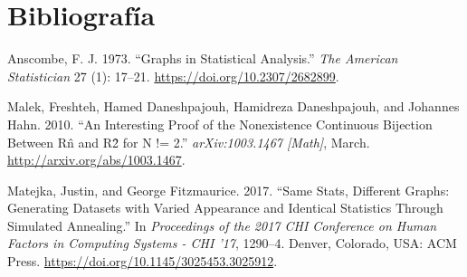 \documentclass[runningheads,español]{llncs}
\begin{document}
\hypertarget{bibliografia}{%
\section*{Bibliografía}\label{bibliografia}}

\hypertarget{refs}{}
\leavevmode\hypertarget{ref-anscombe1973}{}%
Anscombe, F. J. 1973. ``Graphs in Statistical Analysis.'' \emph{The
American Statistician} 27 (1): 17--21.
\url{https://doi.org/10.2307/2682899}.

\leavevmode\hypertarget{ref-malek2010}{}%
Malek, Freshteh, Hamed Daneshpajouh, Hamidreza Daneshpajouh, and
Johannes Hahn. 2010. ``An Interesting Proof of the Nonexistence
Continuous Bijection Between Rn̂ and R2̂ for N != 2.''
\emph{arXiv:1003.1467 {[}Math{]}}, March.
\url{http://arxiv.org/abs/1003.1467}.

\leavevmode\hypertarget{ref-matejka2017}{}%
Matejka, Justin, and George Fitzmaurice. 2017. ``Same Stats, Different
Graphs: Generating Datasets with Varied Appearance and Identical
Statistics Through Simulated Annealing.'' In \emph{Proceedings of the
2017 CHI Conference on Human Factors in Computing Systems - CHI '17},
1290--4. Denver, Colorado, USA: ACM Press.
\url{https://doi.org/10.1145/3025453.3025912}.
%
%
%
% 

% 
%

%
\end{document}
